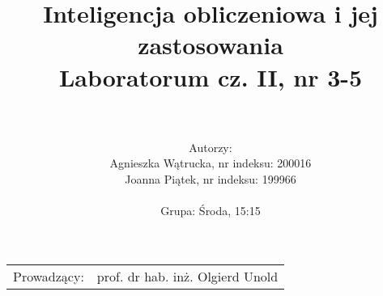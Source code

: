 \documentclass{article}
\title{Inteligencja obliczeniowa i jej zastosowania\\
	\vspace{5mm}
	\textbf{Laboratorum cz. II, nr 3-5}} %
\author{\\
	\\Autorzy:
	\\Agnieszka Wątrucka, nr indeksu: 200016
	\\Joanna Piątek, nr indeksu: 199966
	\\
	\\Grupa: Środa, 15:15} %
\begin{document}
\maketitle %

\begin{center}
\begin{tabular}{l r}
Prowadzący: & prof. dr hab. inż. Olgierd Unold %
\end{tabular}
\end{center}
 
\newpage
\newpage






\newpage
\end{document}
